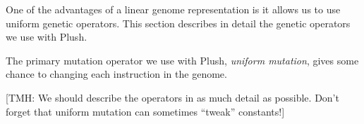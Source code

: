 One of the advantages of a linear genome representation is it allows us to use uniform genetic operators. This section describes in detail the genetic operators we use with Plush.

The primary mutation operator we use with Plush, \textit{uniform mutation}, gives some chance to changing each instruction in the genome. 



[TMH: We should describe the operators in as much detail as possible. Don't forget that uniform mutation can sometimes ``tweak'' constants!]







